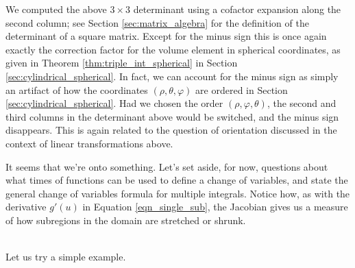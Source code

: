 We computed the above $3\times 3$ determinant using a cofactor expansion along the second column; see Section \ref{sec:matrix_algebra} for the definition of the determinant of a square matrix. Except for the minus sign this is once again exactly the correction factor for the volume element in spherical coordinates, as given in Theorem \ref{thm:triple_int_spherical} in Section \ref{sec:cylindrical_spherical}. In fact, we can account for the minus sign as simply an artifact of how the coordinates $(\rho,\theta,\varphi)$ are ordered in Section \ref{sec:cylindrical_spherical}. Had we chosen the order $(\rho,\varphi,\theta)$, the second and third columns in the determinant above would be switched, and the minus sign disappears. This is again related to the question of orientation discussed in the context of linear transformations above.

It seems that we're onto something. Let's set aside, for now, questions about what times of functions can be used to define a change of variables, and state the general change of variables formula for multiple integrals. 
Notice how, as with the derivative $g'(u)$ in Equation \eqref{eqn_single_sub}, the Jacobian gives us a measure of how subregions in the domain are stretched or shrunk.



\\


Let us try a simple example.\\

